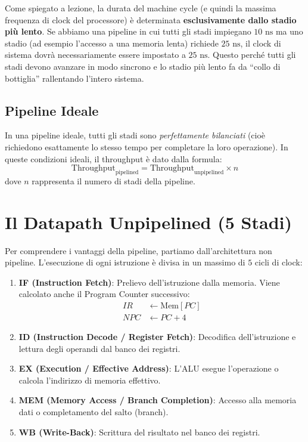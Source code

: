 \begin{remark}
    Come spiegato a lezione, la durata del machine cycle (e quindi la massima frequenza di clock del processore) è determinata \textbf{esclusivamente dallo stadio più lento}. 
    Se abbiamo una pipeline in cui tutti gli stadi impiegano $10\text{ ns}$ ma uno stadio (ad esempio l'accesso a una memoria lenta) richiede $25\text{ ns}$, il clock di sistema dovrà necessariamente essere impostato a $25\text{ ns}$. Questo perché tutti gli stadi devono avanzare in modo sincrono e lo stadio più lento fa da ``collo di bottiglia'' rallentando l'intero sistema.
\end{remark}

\subsection{Pipeline Ideale}
In una pipeline ideale, tutti gli stadi sono \textit{perfettamente bilanciati} (cioè richiedono esattamente lo stesso tempo per completare la loro operazione). In queste condizioni ideali, il throughput è dato dalla formula:
\[
\text{Throughput}_{\text{pipelined}} = \text{Throughput}_{\text{unpipelined}} \times n
\]
dove $n$ rappresenta il numero di stadi della pipeline.

\section{Il Datapath Unpipelined (5 Stadi)}
Per comprendere i vantaggi della pipeline, partiamo dall'architettura non pipeline. L'esecuzione di ogni istruzione è divisa in un massimo di $5$ cicli di clock:
\begin{enumerate}
    \item \textbf{IF (Instruction Fetch)}: Prelievo dell'istruzione dalla memoria. Viene calcolato anche il Program Counter successivo:
    \begin{align*}
        IR &\leftarrow \text{Mem}[PC] \\
        NPC &\leftarrow PC + 4
    \end{align*}
    \item \textbf{ID (Instruction Decode / Register Fetch)}: Decodifica dell'istruzione e lettura degli operandi dal banco dei registri.
    \item \textbf{EX (Execution / Effective Address)}: L'ALU esegue l'operazione o calcola l'indirizzo di memoria effettivo.
    \item \textbf{MEM (Memory Access / Branch Completion)}: Accesso alla memoria dati o completamento del salto (branch).
    \item \textbf{WB (Write-Back)}: Scrittura del risultato nel banco dei registri.
\end{enumerate}

